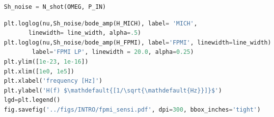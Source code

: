 \begin{spacing}{1.2} \begin{lstlisting}[frame=single, language=Python]
Sh_noise = N_shot(OMEG, P_IN)
\end{lstlisting} \end{spacing}

\begin{spacing}{1.2} \begin{lstlisting}[frame=single, language=Python]
plt.loglog(nu,Sh_noise/bode_amp(H_MICH), label= 'MICH', 
	   linewidth= line_width, alpha=.5)
plt.loglog(nu,Sh_noise/bode_amp(H_FPMI), label='FPMI', linewidth=line_width)
	    label='FPMI LP', linewidth = 20.0, alpha=0.25)
plt.ylim([1e-23, 1e-16])
plt.xlim([1e0, 1e5])
plt.xlabel('frequency [Hz]')
plt.ylabel('H(f) $\mathdefault{[1/\sqrt{\mathdefault{Hz}}]}$')
lgd=plt.legend()
fig.savefig('../figs/INTRO/fpmi_sensi.pdf', dpi=300, bbox_inches='tight')
\end{lstlisting} \end{spacing}

